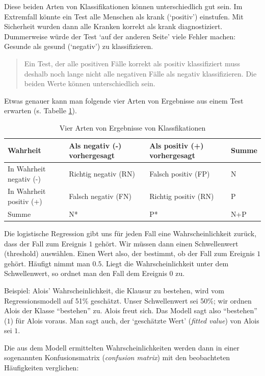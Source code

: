 \documentclass[12pt,ngerman,]{book}
\theoremstyle{definition}
\theoremstyle{definition}
\theoremstyle{remark}
\begin{document}
Diese beiden Arten von Klassifikationen können unterschiedlich gut sein.
Im Extremfall könnte ein Test alle Menschen als krank (`positiv')
einstufen. Mit Sicherheit wurden dann alle Kranken korrekt als krank
diagnostiziert. Dummerweise würde der Test `auf der anderen Seite' viele
Fehler machen: Gesunde als gesund (`negativ') zu klassifizieren.

\begin{quote}
Ein Test, der alle positiven Fälle korrekt als positiv klassifiziert
muss deshalb noch lange nicht alle negativen Fälle als negativ
klassifizieren. Die beiden Werte können unterschiedlich sein.
\end{quote}

Etwas genauer kann man folgende vier Arten von Ergebnisse aus einem Test
erwarten (s. Tabelle \ref{tab:class-stats}).

\begin{table}

\caption{\label{tab:class-stats}Vier Arten von Ergebnisse von Klassfikationen}
\centering
\begin{tabular}[t]{l|l|l|l}
\hline
Wahrheit & Als negativ (-) vorhergesagt & Als positiv (+) vorhergesagt & Summe\\
\hline
In Wahrheit negativ (-) & Richtig negativ (RN) & Falsch positiv (FP) & N\\
\hline
In Wahrheit positiv (+) & Falsch negativ (FN) & Richtig positiv (RN) & P\\
\hline
Summe & N* & P* & N+P\\
\hline
\end{tabular}
\end{table}

Die logistische Regression gibt uns für jeden Fall eine
Wahrscheinlichkeit zurück, dass der Fall zum Ereignis \(1\) gehört. Wir
müssen dann einen Schwellenwert (threshold) auswählen. Einen Wert also,
der bestimmt, ob der Fall zum Ereignis \(1\) gehört. Häufigt nimmt man
\(0.5\). Liegt die Wahrscheinlichkeit unter dem Schwellenwert, so ordnet
man den Fall dem Ereignis \(0\) zu.

Beispiel: Alois' Wahrscheinlichkeit, die Klausur zu bestehen, wird vom
Regressionsmodell auf 51\% geschätzt. Unser Schwellenwert sei 50\%; wir
ordnen Alois der Klasse ``bestehen'' zu. Alois freut sich. Das Modell
sagt also ``bestehen'' (\(1\)) für Alois voraus. Man sagt auch, der
`geschätzte Wert' (\emph{fitted value}) von Alois sei \(1\).

Die aus dem Modell ermittelten Wahrscheinlichkeiten werden dann in einer
sogenannten Konfusionsmatrix (\emph{confusion
matrix}) mit den beobachteten Häufigkeiten verglichen:
\end{document}
